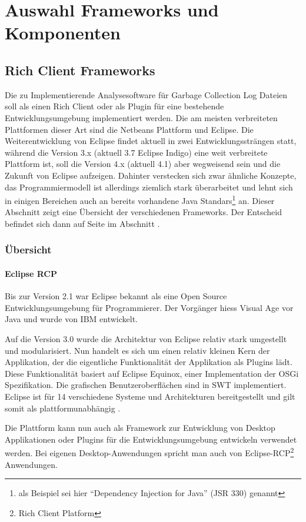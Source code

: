\chapter{Auswahl Frameworks und Komponenten}
\section{Rich Client Frameworks}
Die zu Implementierende Analysesoftware für Garbage Collection Log Dateien soll als einen Rich Client oder als Plugin für eine bestehende Entwicklungsumgebung implementiert werden. Die am meisten verbreiteten Plattformen dieser Art sind die Netbeans Plattform und Eclipse. Die Weiterentwicklung von Eclipse findet aktuell in zwei Entwicklungssträngen statt, während die Version 3.x (aktuell 3.7 Eclipse Indigo) eine weit verbreitete Plattform ist, soll die Version 4.x (aktuell 4.1) aber wegweisend sein und die Zukunft von Eclipse aufzeigen. Dahinter verstecken sich zwar ähnliche Konzepte, das Programmiermodell ist allerdings ziemlich stark überarbeitet und lehnt sich in einigen Bereichen auch an bereits vorhandene Java Standars\footnote{als Beispiel sei hier ``Dependency Injection for Java'' (JSR 330) genannt} an. Dieser Abschnitt zeigt eine Übersicht der verschiedenen Frameworks. Der Entscheid befindet sich dann auf Seite \pageref{rcp_entscheid} im Abschnitt  .

\subsection{Übersicht}
\subsubsection{Eclipse RCP}
Bis zur Version 2.1 war Eclipse bekannt als eine Open Source Entwicklungsumgebung für Programmierer. Der Vorgänger hiess Visual Age vor Java und wurde von IBM entwickelt. 

Auf die Version 3.0 wurde die Architektur von Eclipse relativ stark umgestellt und modularisiert. Nun handelt es sich um einen relativ kleinen Kern der Applikation, der die eigentliche Funktionalität der Applikation als Plugins lädt. Diese Funktionalität basiert auf Eclipse Equinox, einer Implementation der OSGi Spezifikation. Die grafischen Benutzeroberflächen sind in SWT implementiert. Eclipse ist für 14 verschiedene Systeme und Architekturen bereitgestellt und gilt somit als plattformunabhängig \cite{wiki:eclipse}. 

Die Plattform kann nun auch als Framework zur Entwicklung von Desktop Applikationen oder Plugins für die Entwicklungsumgebung entwickeln verwendet werden. Bei eigenen Desktop-Anwendungen spricht man auch von Eclipse-RCP\footnote{Rich Client Platform} Anwendungen.



